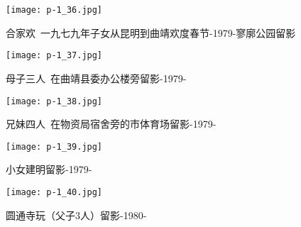 \clearpage


\begin{figure}
    \begin{center}
        \texttt{[image: p-1\_36.jpg]}
        \begin{shaded}
            \caption{合家欢~一九七九年子女从昆明到曲靖欢度春节-1979-寥廓公园留影}
        \end{shaded}
    \end{center}
\end{figure}

\clearpage


\begin{figure}
    \begin{center}
        \texttt{[image: p-1\_37.jpg]}
        \begin{shaded}
            \caption{母子三人~在曲靖县委办公楼旁留影-1979-}
        \end{shaded}
    \end{center}
\end{figure}

\clearpage


\begin{figure}
    \begin{center}
        \texttt{[image: p-1\_38.jpg]}
        \begin{shaded}
            \caption{兄妹四人~在物资局宿舍旁的市体育场留影-1979-}
        \end{shaded}
    \end{center}
\end{figure}

\clearpage


\begin{figure}
    \begin{center}
        \texttt{[image: p-1\_39.jpg]}
        \begin{shaded}
            \caption{小女建明留影-1979-}
        \end{shaded}
    \end{center}
\end{figure}

\clearpage


\begin{figure}
    \begin{center}
        \texttt{[image: p-1\_40.jpg]}
        \begin{shaded}
            \caption{圆通寺玩（父子3人）留影-1980-}
        \end{shaded}
    \end{center}
\end{figure}

